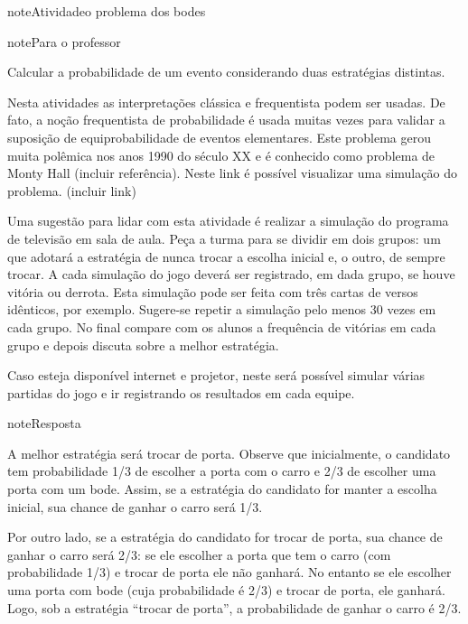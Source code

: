 \label{\detokenize{PE511-5:sec-praticando-propriedades}}\label{\detokenize{PE511-5::doc}}\label{\detokenize{PE511-5:praticando-probabilidade-regras-basicas-e-propriedades}}\begin{sphinxadmonition}{note}{Atividade}{o problema dos bodes}
\label{ativ-problema-dos-bodes}

\begin{sphinxadmonition}{note}{Para o professor}

  Calcular a probabilidade de um evento considerando duas estratégias distintas.

 Nesta atividades as interpretações clássica e frequentista podem ser usadas. De fato, a noção frequentista de probabilidade é usada muitas vezes para validar a suposição de equiprobabilidade de eventos elementares. Este problema gerou muita polêmica nos anos 1990 do século XX e é conhecido como problema de Monty Hall (incluir referência). Neste link é possível visualizar uma simulação do problema. (incluir link)

Uma sugestão para lidar com esta atividade é realizar a simulação do programa de televisão em sala de aula. Peça a turma para se dividir em dois grupos: um que adotará a estratégia de nunca trocar a escolha inicial e, o outro, de sempre trocar. A cada simulação do jogo deverá ser registrado, em dada grupo, se houve vitória ou derrota. Esta simulação pode ser feita com três cartas de versos idênticos, por exemplo. Sugere-se repetir a simulação pelo menos 30 vezes em cada grupo. No final compare com os alunos a frequência de vitórias em cada grupo e depois discuta sobre a melhor estratégia.

Caso esteja disponível internet e projetor, neste   será possível simular várias partidas do jogo e ir registrando os resultados em cada equipe.

\begin{sphinxadmonition}{note}{Resposta}

A melhor estratégia será trocar de porta. Observe que inicialmente, o candidato tem probabilidade 1/3 de escolher a porta com o carro e  2/3  de escolher uma porta com um bode.
Assim, se a estratégia do candidato for manter a escolha inicial, sua chance de ganhar o carro será 1/3.

Por outro lado, se a estratégia do candidato for trocar de porta, sua chance de ganhar o carro será 2/3: se ele escolher a porta que tem o carro (com probabilidade 1/3) e trocar de porta ele não ganhará. No entanto se ele escolher uma porta com bode (cuja probabilidade é 2/3) e trocar de porta, ele ganhará. Logo, sob a estratégia “trocar de porta”, a probabilidade de ganhar o carro é 2/3.


\end{sphinxadmonition}
\end{sphinxadmonition}
\end{sphinxadmonition}
